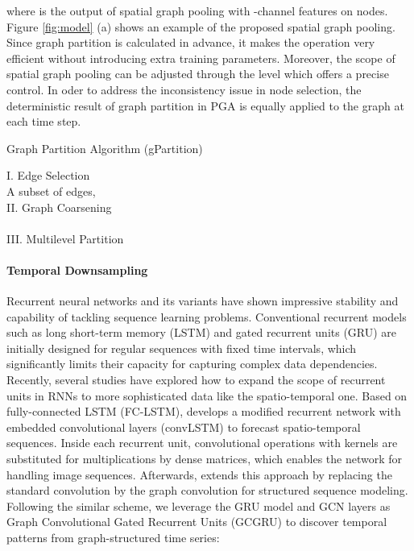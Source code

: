 \documentclass[sigconf,screen]{acmart}
\begin{document}
where  is the output of spatial graph pooling with -channel features on  nodes. Figure \ref{fig:model} (a) shows an example of the proposed spatial graph pooling. Since graph partition is calculated in advance, it makes the operation very efficient without introducing extra training parameters. Moreover, the scope of spatial graph pooling can be adjusted through the level  which offers a precise control. In oder to address the inconsistency issue in node selection, the deterministic result of graph partition in PGA is equally applied to the graph  at each time step.
\begin{algorithm}
\caption{\label{alg:pga} Graph Partition Algorithm (gPartition)} 


\nonl I. Edge Selection\\
A subset of edges, \;
\Return \\
\nonl II. Graph Coarsening\\
\Return  \label{alg:loop}\\
\nonl III. Multilevel Partition\\
\end{algorithm}

\paragraph{Temporal Downsampling}
Recurrent neural networks and its variants have shown impressive stability and capability of tackling sequence learning problems. Conventional recurrent models such as long short-term memory (LSTM) \cite{hochreiter1997long} and gated recurrent units (GRU) \cite{chung2014empirical} are initially designed for regular sequences with fixed time intervals, which significantly limits their capacity for capturing complex data dependencies. Recently, several studies have explored how to expand the scope of recurrent units in RNNs to more sophisticated data like the spatio-temporal one. Based on fully-connected LSTM (FC-LSTM), \cite{xingjian2015convolutional} develops a modified recurrent network with embedded convolutional layers (convLSTM) to forecast spatio-temporal sequences. Inside each recurrent unit, convolutional operations with kernels are substituted for multiplications by dense matrices, which enables the network for handling image sequences. Afterwards, \cite{seo2018structured} extends this approach by replacing the standard convolution by the graph convolution for structured sequence modeling. Following the similar scheme, we leverage the GRU model and GCN layers as Graph Convolutional Gated Recurrent Units (GCGRU) to discover temporal patterns from graph-structured time series:
\end{document}
